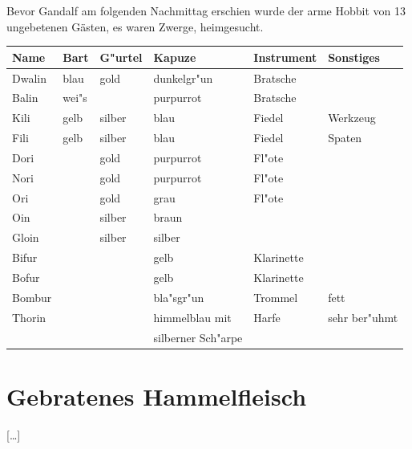 \documentclass[a4paper]{article}
\begin{document}
Bevor Gandalf am folgenden Nachmittag erschien wurde der arme Hobbit
von 13 ungebetenen G\"asten, es waren Zwerge, heimgesucht.
%
\begin{center}
\begin{tabular}{l||l|l|l|l|l}
Name & Bart & G"urtel & Kapuze & Instrument & Sonstiges \\\hline
Dwalin & blau & gold & dunkelgr"un & Bratsche & \\
Balin & wei"s & & purpurrot & Bratsche & \\
Kili & gelb & silber & blau & Fiedel & Werkzeug \\
Fili & gelb & silber & blau & Fiedel & Spaten \\
Dori & & gold & purpurrot & Fl"ote & \\
Nori & & gold & purpurrot & Fl"ote & \\
Ori & & gold & grau & Fl"ote & \\
Oin & & silber & braun & & \\
Gloin & & silber & silber & & \\
Bifur & & & gelb & Klarinette & \\
Bofur & & & gelb & Klarinette & \\
Bombur & & & bla"sgr"un & Trommel & fett \\
Thorin & & & himmelblau mit & Harfe & sehr ber"uhmt \\
 & & & silberner Sch"arpe & &
\end{tabular}
\end{center}
%
\section{Gebratenes Hammelfleisch}
[\dots]
\end{document}
